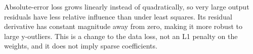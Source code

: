 Absolute-error loss grows linearly instead of quadratically, so very large output residuals have less relative influence than under least squares. Its residual derivative has constant magnitude away from zero, making it more robust to large y-outliers. This is a change to the data loss, not an L1 penalty on the weights, and it does not imply sparse coefficients.
